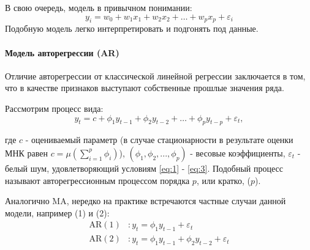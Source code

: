 В свою очередь, модель в привычном понимании:
\begin{equation*}
    y_i = w_0 + w_1 x_1 + w_2 x_2 + \dots + w_p x_p + \varepsilon_i
\end{equation*}
Подобную модель легко интерпретировать и подгонять под данные.

\paragraph{Модель авторегрессии (AR)}

Отличие авторегрессии от классической линейной регрессии заключается в том, 
что в качестве \guillemotleft признаков\guillemotright {} выступают 
собственные прошлые значения ряда.

Рассмотрим процесс вида:
\begin{equation*}
    y_t = c + \phi_1 y_{t-1} + \phi_2 y_{t-2} + \dots + \phi_p y_{t-p} + \varepsilon_t,
\end{equation*}

где $c$ - оцениваемый параметр (в случае стационарности в результате оценки МНК равен 
$c = \mu (\sum_{i=1}^p \phi_i)$), 
$(\phi_1, \phi_2, ..., \phi_p)$ - весовые коэффициенты, $\varepsilon_t$ - 
белый шум, удовлетворяющий условиям \eqref{eq:1} - \eqref{eq:3}. Подобный процесс 
называют авторегрессионным процессом порядка $p$, или кратко, ($p$).

Аналогично MA, нередко на практике встречаются частные случаи данной модели, например (1) и 
(2):
\begin{align*}
    \text{AR}(1) &: y_t = \phi_1 y_{t-1} + \varepsilon_t \\
    \text{AR}(2) &: y_t = \phi_1 y_{t-1} + \phi_2 y_{t-2} + \varepsilon_t
\end{align*}



